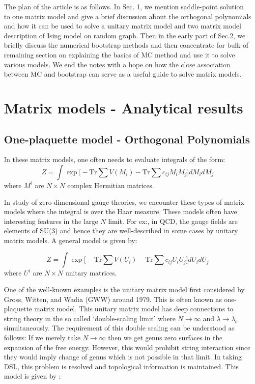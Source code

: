 \documentclass[11pt]{article}
\begin{document}
The plan of the article is as follows. In Sec. 1, we mention saddle-point solution to one matrix model and give a brief discussion about the orthogonal polynomials and how it can be used to solve a unitary matrix model and 
two matrix model description of Ising model on random graph. Then in the early part of Sec.2, we briefly discuss the 
numerical bootstrap methods and then concentrate for bulk of remaining section on
explaining the basics of MC method and use it to solve various models. 
We end the notes with a hope on how the close association between MC 
and bootstrap can serve as a useful guide to solve matrix models. 


\section{Matrix models - Analytical results} 

\subsection{One-plaquette model - Orthogonal Polynomials} 

In these matrix models, one often needs to evaluate integrals of the form:
\begin{equation}
Z = \int \exp\Bigg[  -\mathrm{Tr} \sum V(M_{i})  -  \mathrm{Tr} \sum c_{ij}M_{i}M_{j}   \Bigg] dM_{i} dM_{j}
\end{equation}
where $M^{i}$ are $N \times N$ complex Hermitian matrices. 


In study of zero-dimensional gauge theories, we encounter these types of matrix models where the integral is over the Haar measure. These models often have interesting features in the large $N$ limit.
For ex:, in QCD, the gauge fields are elements of SU(3) and hence they are well-described in some cases by unitary matrix models. A general model is given by:



\begin{equation}
	Z = \int \exp\Bigg[  -\mbox{Tr} \sum V(U_{i})  -  \mbox{Tr} \sum c_{ij}U_{i}U_{j}   \Bigg] dU_{i} dU_{j}
\end{equation}
where $U^{i}$ are $N \times N$ unitary matrices. 

One of the well-known examples is the unitary matrix model first considered by Gross, Witten, and Wadia (GWW) around 1979. This is often known as one-plaquette matrix model. This unitary matrix model 
has deep connections to string theory in the so called `double-scaling limit' where $N \to \infty$ and $\lambda \to \lambda_{c}$ simultaneously. The requirement of this double scaling can be understood as follows: If we merely take $N \to \infty$ then we get genus zero surfaces in the expansion of the free energy. However, this would prohibit string interaction since they would imply change of genus which is not possible in that limit. In taking DSL, this problem is resolved and topological information is maintained. This model is given by : 
\end{document}
